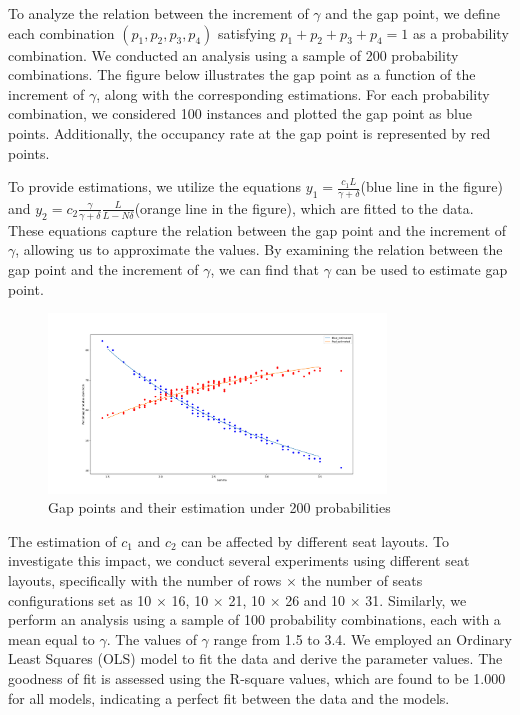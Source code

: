 To analyze the relation between the increment of $\gamma$ and the gap point, we define each combination $(p_1, p_2, p_3, p_4)$ satisfying $p_1 + p_2 + p_3 + p_4 = 1$ as a probability combination. We conducted an analysis using a sample of 200 probability combinations. The figure below illustrates the gap point as a function of the increment of $\gamma$, along with the corresponding estimations. For each probability combination, we considered 100 instances and plotted the gap point as blue points. Additionally, the occupancy rate at the gap point is represented by red points.

To provide estimations, we utilize the equations $y_1 = \frac{c_1 L}{\gamma + \delta}$(blue line in the figure) and $y_2 = c_2 \frac{\gamma}{\gamma + \delta} \frac{L}{L-N \delta}$(orange line in the figure), which are fitted to the data. These equations capture the relation between the gap point and the increment of $\gamma$, allowing us to approximate the values. By examining the relation between the gap point and the increment of $\gamma$, we can find that $\gamma$ can be used to estimate gap point.

\begin{figure}[ht]
  \centering
    \includegraphics[width=0.8\textwidth]{./Figures/re2.pdf}
  \caption{Gap points and their estimation under 200 probabilities}
\end{figure}



The estimation of $c_1$ and $c_2$ can be affected by different seat layouts. To investigate this impact, we conduct several experiments using different seat layouts, specifically with the number of rows $\times$ the number of seats configurations set as 10 $\times$ 16, 10 $\times$ 21, 10 $\times$ 26 and 10 $\times$ 31. Similarly, we perform an analysis using a sample of 100 probability combinations, each with a mean equal to $\gamma$. The values of $\gamma$ range from 1.5 to 3.4. We employed an Ordinary Least Squares (OLS) model to fit the data and derive the parameter values. The goodness of fit is assessed using the R-square values, which are found to be 1.000 for all models, indicating a perfect fit between the data and the models.

